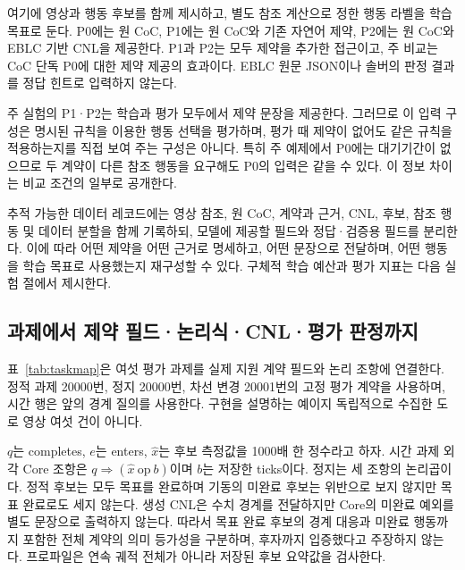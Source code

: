 \documentclass[10pt,a4paper,twocolumn]{article}\usepackage[margin=18mm]{geometry}\usepackage{fontspec,kotex}
\begin{document}
여기에 영상과 행동 후보를 함께 제시하고, 별도 참조 계산으로 정한 행동 라벨을 학습 목표로 둔다. P0에는 원 CoC, P1에는 원 CoC와 기존 자연어 제약, P2에는 원 CoC와 EBLC 기반 CNL을 제공한다. P1과 P2는 모두 제약을 추가한 접근이고, 주 비교는 CoC 단독 P0에 대한 제약 제공의 효과이다. EBLC 원문 JSON이나 솔버의 판정 결과를 정답 힌트로 입력하지 않는다.\par

주 실험의 P1·P2는 학습과 평가 모두에서 제약 문장을 제공한다. 그러므로 이 입력 구성은 명시된 규칙을 이용한 행동 선택을 평가하며, 평가 때 제약이 없어도 같은 규칙을 적용하는지를 직접 보여 주는 구성은 아니다. 특히 주 예제에서 P0에는 대기기간이 없으므로 두 계약이 다른 참조 행동을 요구해도 P0의 입력은 같을 수 있다. 이 정보 차이는 비교 조건의 일부로 공개한다.\par

추적 가능한 데이터 레코드에는 영상 참조, 원 CoC, 계약과 근거, CNL, 후보, 참조 행동 및 데이터 분할을 함께 기록하되, 모델에 제공할 필드와 정답·검증용 필드를 분리한다. 이에 따라 어떤 제약을 어떤 근거로 명세하고, 어떤 문장으로 전달하며, 어떤 행동을 학습 목표로 사용했는지 재구성할 수 있다. 구체적 학습 예산과 평가 지표는 다음 실험 절에서 제시한다.\par

\subsection{과제에서 제약 필드·논리식·CNL·평가 판정까지}

표~\ref{tab:taskmap}은 여섯 평가 과제를 실제 지원 계약 필드와 논리 조항에 연결한다. 정적 과제 20000번, 정지 20000번, 차선 변경 20001번의 고정 평가 계약을 사용하며, 시간 행은 앞의 경계 질의를 사용한다. 구현을 설명하는 예이지 독립적으로 수집한 도로 영상 여섯 건이 아니다.\par

$q$는 {\ttfamily{}\selectfont\footnotesize completes}, $e$는 {\ttfamily{}\selectfont\footnotesize enters}, $\widehat{x}$는 후보 측정값을 1000배 한 정수라고 하자. 시간 과제 외 각 Core 조항은 $q\Rightarrow(\widehat{x}\ \mathrm{op}\ b)$이며 $b$는 저장한 {\ttfamily{}\selectfont\footnotesize ticks}이다. 정지는 세 조항의 논리곱이다. 정적 후보는 모두 목표를 완료하며 기동의 미완료 후보는 위반으로 보지 않지만 목표 완료로도 세지 않는다. 생성 CNL은 수치 경계를 전달하지만 Core의 미완료 예외를 별도 문장으로 출력하지 않는다. 따라서 목표 완료 후보의 경계 대응과 미완료 행동까지 포함한 전체 계약의 의미 등가성을 구분하며, 후자까지 입증했다고 주장하지 않는다. 프로파일은 연속 궤적 전체가 아니라 저장된 후보 요약값을 검사한다.\par
\end{document}

